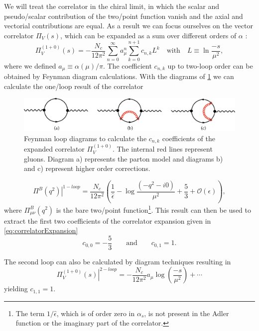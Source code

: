 \documentclass[../../index.tex]{subfiles}
\begin{document}
We will treat the correlator in the chiral limit, in which the scalar and
pseudo\-/scalar contribution of the two\-/point function vanish and the axial
and vectorial contributions are equal. As a result we can focus ourselves on the
vector correlator \(\Pi_V(s)\), which can be expanded as a sum over different
orders of \(\alpha\) \cite{Beneke2008}:
\begin{equation}
  \label{eq:correlatorExpansion}
  \Pi_V^{(1+0)}(s) = - \frac{N_c}{12 \pi^2} \sum_{n=0}^\infty a_\mu^n \sum_{k=0}^{n+1} c_{n,k} L^{k} \quad \text{with} \quad L \equiv \ln \frac{-s}{\mu^2},
\end{equation}
where we defined \(a_\mu \equiv \alpha(\mu)/ \pi\). The coefficient \(c_{n,k}\)
up to two-loop order can be obtained by Feynman diagram calculations. With the
diagrams of \cref{fig:perturbativeContributionFeynmanDiagrams} we can calculate
the one\-/loop result of the correlator \cite{Jamin2006}
\begin{figure}
  \centering
  \includegraphics[width=\textwidth]{./images/correlatorLoopDiagrams.eps}
  \caption{Feynman loop diagrams to calculate the \(c_{n,k}\) coefficients of
    the expanded correlator \(\Pi_V^{(1+0)}\). The internal red lines represent
    gluons. Diagram a) represents the parton model and diagrams b) and c)
    represent higher order corrections.}
  \label{fig:perturbativeContributionFeynmanDiagrams}
\end{figure}
\begin{equation}
  \left. \Pi^B(q^2) \right\rvert^{1-loop} = \frac{N_c}{12\pi^2} \left( \frac{1}{\hat \epsilon} - \log\frac{(-q^2 - i0)}{\mu^2} + \frac{5}{3} + \mathcal{O}(\epsilon) \right),
\end{equation}
where \(\Pi^B_{\mu\nu}(q^2)\) is the bare two\-/point function\footnote{The
  term \(1/ \hat \epsilon\), which is of order zero in \(\alpha_s\), is not
  present in the Adler function or the imaginary part of the correlator.}. This
result can then be used to extract the first two coefficients of the correlator
expansion given in \cref{eq:correlatorExpansion}
\begin{equation}
  c_{0,0} = - \frac{5}{3} \qquad \text{and} \qquad c_{0,1} = 1.
\end{equation}

The second loop can also be calculated by diagram techniques resulting in
\cite{Boito2011}
\begin{equation}
  \left. \Pi_V^{(1+0)}(s) \right\rvert^{2-loop} = -\frac{N_c}{12\pi^2} a_\mu \log(\frac{-s}{\mu^2}) + \cdots
\end{equation}
yielding \(c_{1,1} = 1\).
\end{document}
